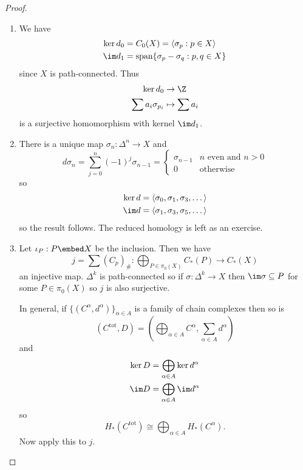 \documentclass[a4paper]{article}
\begin{document}
\begin{proof}\leavevmode
  \begin{enumerate}
  \item We have
    \begin{align*}
      \ker d_0 &= C_0(X) = \langle \sigma_p: p \in X \rangle \\
      \im d_1 &= \text{span} \{\sigma_p - \sigma_q: p, q \in X\}
    \end{align*}
    since \(X\) is path-connected. Thus
    \begin{align*}
      \ker d_0 &\to \Z \\
      \sum a_i \sigma_{p_i} &\mapsto \sum a_i
    \end{align*}
    is a surjective homomorphism with kernel \(\im d_1\).
  \item There is a unique map \(\sigma_n: \Delta^n \to X\) and
    \[
      d \sigma_n = \sum_{j = 0}^n (-1)^j \sigma_{n - 1} =
      \begin{cases}
        \sigma_{n - 1} & n \text{ even and } n > 0 \\
        0 & \text{otherwise}
      \end{cases}
    \]
    so
    \begin{align*}
      \ker d &= \langle \sigma_0, \sigma_1, \sigma_3, \dots \rangle \\
      \im d &= \langle \sigma_1, \sigma_3, \sigma_5, \dots \rangle
    \end{align*}
    so the result follows. The reduced homology is left as an exercise.
  \item Let \(\iota_P: P \embed X\) be the inclusion. Then we have
    \[
      j = \sum (C_p)_\#: \bigoplus_{P \in \pi_0(X)} C_*(P) \to C_*(X)
    \]
    an injective map. \(\Delta^k\) is path-connected so if \(\sigma: \Delta^k \to X\) then \(\im \sigma \subseteq P\) for some \(P \in \pi_0(X)\) so \(j\) is also surjective.

    In general, if \(\{(C^\alpha, d^\alpha)\}_{\alpha \in A}\) is a family of chain complexes then so is
    \[
      (C^{\text{tot}}, D) = (\bigoplus_{\alpha \in A} C^\alpha, \sum_{\alpha \in A} d^\alpha)
    \]
    and
    \begin{align*}
      \ker D &= \bigoplus_{\alpha \in A} \ker d^\alpha \\
      \im D &= \bigoplus_{\alpha \in A} \im d^\alpha
    \end{align*}
    so
    \[
      H_*(C^{\text{tot}}) \cong \bigoplus_{\alpha \in A} H_*(C^\alpha).
    \]
    Now apply this to \(j\).
  \end{enumerate}
\end{proof}
\end{document}
